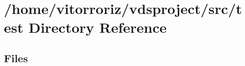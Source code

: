 \section{/home/vitorroriz/vdsproject/src/test Directory Reference}
\label{dir_120ed4da3e3217b1e7fc0b4f48568e79}
\subsection*{Files}
\begin{DoxyCompactItemize}
\end{DoxyCompactItemize}

